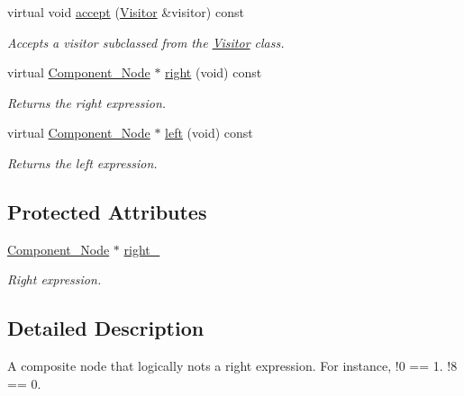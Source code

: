 \begin{DoxyCompactItemize}
virtual void \hyperlink{classMadara_1_1Expression__Tree_1_1Composite__Not__Node_a4123f66ae7ef032f6e8518f766473de1}{accept} (\hyperlink{classMadara_1_1Expression__Tree_1_1Visitor}{Visitor} \&visitor) const 
\begin{DoxyCompactList}\small\item\em Accepts a visitor subclassed from the \hyperlink{classMadara_1_1Expression__Tree_1_1Visitor}{Visitor} class. \item\end{DoxyCompactList}\item 
virtual \hyperlink{classMadara_1_1Expression__Tree_1_1Component__Node}{Component\_\-Node} $\ast$ \hyperlink{classMadara_1_1Expression__Tree_1_1Composite__Unary__Node_ade55cde5707e0fa73ab1c019159b9aec}{right} (void) const 
\begin{DoxyCompactList}\small\item\em Returns the right expression. \item\end{DoxyCompactList}\item 
virtual \hyperlink{classMadara_1_1Expression__Tree_1_1Component__Node}{Component\_\-Node} $\ast$ \hyperlink{classMadara_1_1Expression__Tree_1_1Component__Node_abe0c7474f1af4cb06d06ab13479a89db}{left} (void) const 
\begin{DoxyCompactList}\small\item\em Returns the left expression. \item\end{DoxyCompactList}\end{DoxyCompactItemize}
\subsection*{Protected Attributes}
\begin{DoxyCompactItemize}
\item 
\hyperlink{classMadara_1_1Expression__Tree_1_1Component__Node}{Component\_\-Node} $\ast$ \hyperlink{classMadara_1_1Expression__Tree_1_1Composite__Unary__Node_a077b7bd1b52df6f5c6adfde735556a68}{right\_\-}
\begin{DoxyCompactList}\small\item\em Right expression. \item\end{DoxyCompactList}\end{DoxyCompactItemize}


\subsection{Detailed Description}
A composite node that logically nots a right expression. For instance, !0 == 1. !8 == 0. 

